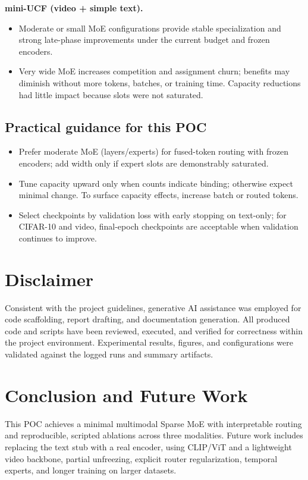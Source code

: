 \documentclass[11pt,a4paper]{article}
\begin{document}
\textbf{mini-UCF (video + simple text).}
\begin{itemize}[leftmargin=*]
  \item Moderate or small MoE configurations provide stable specialization and strong late-phase improvements under the current budget and frozen encoders.
  \item Very wide MoE increases competition and assignment churn; benefits may diminish without more tokens, batches, or training time. Capacity reductions had little impact because slots were not saturated.
\end{itemize}

\subsection*{Practical guidance for this POC}
\begin{itemize}[leftmargin=*]
  \item Prefer moderate MoE (layers/experts) for fused-token routing with frozen encoders; add width only if expert slots are demonstrably saturated.
  \item Tune capacity upward only when counts indicate binding; otherwise expect minimal change. To surface capacity effects, increase batch or routed tokens.
  \item Select checkpoints by validation loss with early stopping on text-only; for CIFAR-10 and video, final-epoch checkpoints are acceptable when validation continues to improve.
\end{itemize}

\section{Disclaimer}
Consistent with the project guidelines, generative AI assistance was employed for code scaffolding, report drafting, and documentation generation. All produced code and scripts have been reviewed, executed, and verified for correctness within the project environment. Experimental results, figures, and configurations were validated against the logged runs and summary artifacts.

\section{Conclusion and Future Work}
This POC achieves a minimal multimodal Sparse MoE with interpretable routing and reproducible, scripted ablations across three modalities. Future work includes replacing the text stub with a real encoder, using CLIP/ViT and a lightweight video backbone, partial unfreezing, explicit router regularization, temporal experts, and longer training on larger datasets.
\end{document}
